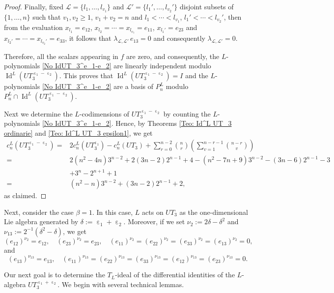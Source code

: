 \documentclass[a4paper,reqno]{amsart}
\theoremstyle{definition}
\numberwithin{equation}{section}
\numberwithin{theorem}{section}
\DeclareMathOperator{\I}{Id}
\DeclareMathOperator{\e}{\varepsilon}
\begin{document}
\begin{proof}
Finally, fixed $\mathcal L=\{l_1,\ldots,l_{v_1}\}$ and $\mathcal L'=\{l_1',\ldots,l_{v_2}'\}$
disjoint subsets of $\{1,\ldots,n\}$ such that $v_1,v_2\ge1$, $v_1+v_2=n$ and $l_1<\cdots<l_{v_1}$,
$l_1'<\cdots<l_{v_2}'$, then from the evaluation $x_{l_1}=e_{12}$,
$x_{l_2}=\cdots=x_{l_{v_1}}=e_{11}$, $x_{l_1'}=e_{23}$ and $x_{l_2'}=\cdots=x_{l_{v_2}'}=e_{33}$,
it follows that $\lambda_{\mathcal L,\mathcal L'}\,e_{13}=0$ and consequently
$\lambda_{\mathcal L,\mathcal L'}=0$.

Therefore, all the scalars appearing in $f$ are zero, and consequently, the $L$-polynomials
\eqref{No IdUT_3^e_1-e_2} are linearly independent modulo $\I^L(UT_3^{\e_1-\e_2})$. This proves that
$\I^L(UT_3^{\e_1-\e_2})=I$ and the $L$-polynomials \eqref{No IdUT_3^e_1-e_2} are a basis of $P_n^L$
modulo $P_n^L\cap\I^L(UT_3^{\e_1-\e_2})$.

  
  Next we determine the $L$-codimensions of $UT_3^{\e_1-\e_2}$ by counting the $L$-polynomials \eqref{No IdUT_3^e_1-e_2}. 
Hence, by Theorems \ref{Teo: Id^L UT_3 ordinarie} and \ref{Teo: Id^L UT_3 epsilon1}, we get
\begin{align*}
     c_n^L(UT_3^{\e_1-\e_2}) =&   2 c_n^L(UT_3^{\e_1})-c_n^L(UT_3)+\sum_{r=0}^{n-2} \binom{n}{r} \left( \sum_{v=1}^{n-r-1}\binom{n-r}{v}\right)\\
      = &2(n^2-4n)3^{n-2}+ 2(3n-2)2^{n-1} +4-(n^2-7n+9) 3^{n-2}-(3n-6)2^{n-1}-3\\
     &+3^n-2^{n+1}+1\\
      = &(n^2 - n)3^{n-2} + (3n - 2)2^{n-1} + 2,
\end{align*}
as claimed.
\end{proof}


Next, consider the case $\beta=1$. In this case, $L$ acts on $UT_3$ as the one-dimensional Lie algebra generated by $\delta:=\e_1+\e_2.$ Moreover, if we set $\nu_{2}:=2\delta-\delta^2$ and $\nu_{13}:=2^{-1}(\delta^2-\delta)$, we get
\begin{equation}\label{eq: nu_2}
    (e_{12})^{\nu_{2}}=e_{12}, \quad (e_{23})^{\nu_{2}}=e_{23}, \quad (e_{11})^{\nu_{2}} = (e_{22})^{\nu_2} = (e_{33})^{\nu_{2}}= (e_{13})^{\nu_{2}} =0,
\end{equation}
and
\begin{equation}\label{eq: nu_13}
   (e_{13})^{\nu_{13}}=e_{13}, \quad  (e_{11})^{\nu_{13}} = (e_{22})^{\nu_{13}} = (e_{33})^{\nu_{13}}= (e_{12})^{\nu_{13}}=(e_{23})^{\nu_{13}} =0.
\end{equation}

Our next goal is to determine the $T_L$-ideal of the differential identities of the $L$-algebra $UT_3^{\e_1+\e_2}.$ We begin with several technical lemmas.
\end{document}
